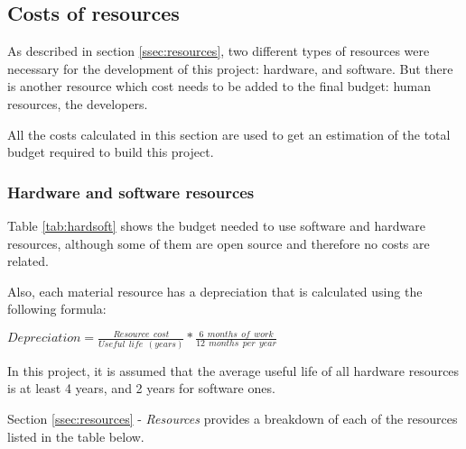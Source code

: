 \setcounter{PMHours}{%
	\numexpr\value{tUnHours}+\value{tDosHours}+\value{tTresHours}+\value{tCincHours}+\value{tSisHours}\relax%
	} 	
\setcounter{PMHoursTotal}{\numexpr\value{PMHours}*26\relax} 
	
\setcounter{DesignHours}{%
	\numexpr\value{tQuatreUnHours}+\value{tQuatreDosHours}\relax%
	} 
\setcounter{DesignHoursTotal}{\numexpr\value{DesignHours}*31\relax} 

\subsection{Costs of resources}
\label{ssec:costOfResources}
As described in section \ref{ssec:resources}, two different types of resources were necessary for the development of this project: hardware, and software. But there is another resource which cost needs to be added to the final budget: human resources, the developers.

All the costs calculated in this section are used to get an estimation of the total budget required to build this project.

\subsubsection{Hardware and software resources}
Table \ref{tab:hardsoft} shows the budget needed to use software and hardware resources, although some of them are open source and therefore no costs are related. 

Also, each material resource has a depreciation that is calculated using the following formula:

\vspace{25pt}
\centerline{ \LARGE $ Depreciation = \frac{Resource\ \ cost}{Useful\ \ life\ \ (years)} * \frac{6\ \ months\ \ of\ \ work}{12\ \ months\ \ per\ \ year} $ } 
\vspace{10pt}

In this project, it is assumed that the average useful life of all hardware resources is at least 4 years, and 2 years for software ones. 

Section \ref{ssec:resources} - \textit{Resources} provides a breakdown of each of the resources listed in the table below.

